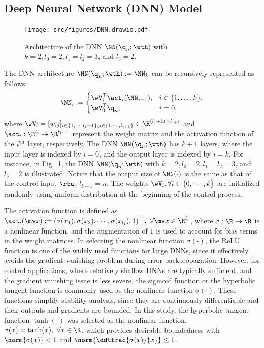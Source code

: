 \documentclass[journal]{IEEEtran}
\begin{document}
\subsection{Deep Neural Network (DNN) Model}\label{sec:sub:NN definition}

\begin{figure}[t]
    \centering
    \texttt{[image: src/figures/DNN.drawio.pdf]}
    \caption{
        Architecture of the DNN $\NN({\q}_n;\wth)$ with $k=2,l_0=2,l_1=l_2=3$, and $l_3=2$.
    }
    \label{fig:DNN}
\end{figure}

The DNN architecture $\NN({\q}_n;\wth) := \NN_k$ can be recursively represented as follows:
\begin{equation}
    \NN_i :=
    \begin{cases}
        \wV_i^\top \act_i(\NN_{i-1}), 
        &
        i\in\{1,\dots ,k\},
        \\
        \wV_0^\top {\q}_n,
        &
        i=0
        ,
    \end{cases}
    \label{eq:DNN:architecture}
\end{equation}
where $\wV_i=[w_{ij}]_{i\in\{1,\cdots,l_i+1\},j\in\{1,\cdots,l_{i+1}\}}\in\R^{(l_i+1)\times l_{i+1}}$ and $\act_i: \R^{l_i}\to\R^{l_i+1}$ represent the weight matrix and the activation function of the $i\textsuperscript{th}$ layer, respectively.
The DNN $\NN({\q}_n;\wth)$ has $k+1$ layers, where the input layer is indexed by $i=0$, and the output layer is indexed by $i=k$.
For instance, in Fig.~\ref{fig:DNN}, the DNN $\NN({\q}_n;\wth)$ with $k=2,l_0=2,l_1=l_2=3$, and $l_3=2$ is illustrated.
Notice that the output size of $\NN(\cdot)$ is the same as that of the control input $\rbu$, \ie $l_{k+1}=n$. 
The weights $\wV_i,\forall i\in\{0,\cdots,k\}$ are initialized randomly using uniform distribution at the beginning of the control process.

The activation function is defined as $\act_i(\mv x):=\left(\sigma(x_1),\sigma(x_2),\cdots, \sigma(x_{l_{i}}), 1\right)^\top,\ \forall\mv x\in\R^{l_i}$, where $\sigma: \R\to\R$ is a nonlinear function, and the augmentation of $1$ is used to account for bias terms in the weight matrices. 
In selecting the nonlinear function $\sigma(\cdot)$, the ReLU function \cite{Maas:2013aa} is one of the widely used functions for large DNNs, since it effectively avoids the gradient vanishing problem during error backpropagation. 
However, for control applications, where relatively shallow DNNs are typically sufficient, and the gradient vanishing issue is less severe, the sigmoid function or the hyperbolic tangent function is commonly used as the nonlinear function $\sigma(\cdot)$. 
These functions simplify stability analysis, since they are continuously differentiable and their outputs and gradients are bounded. 
In this study, the hyperbolic tangent function $\tanh(\cdot)$ was selected as the nonlinear function, \ie $\sigma(x) = \tanh(x),\ \forall x\in\R$, which provides desirable boundedness with $\norm{\sigma(x)}<1$ and $\norm{\ddtfrac{\sigma(x)}{x}}\le 1$.
\end{document}

